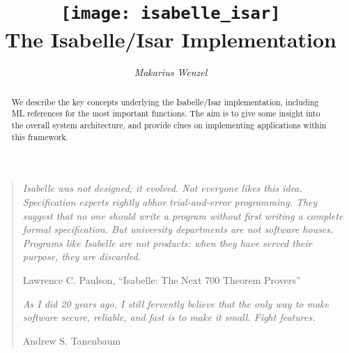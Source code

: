 \documentclass[12pt,a4paper,fleqn]{report}
\title{\texttt{[image: isabelle\_isar]}
  \\[4ex] The Isabelle/Isar Implementation}
\author{\emph{Makarius Wenzel}}
\begin{document}
\maketitle 

\begin{abstract}
  We describe the key concepts underlying the Isabelle/Isar
  implementation, including ML references for the most important
  functions.  The aim is to give some insight into the overall system
  architecture, and provide clues on implementing applications within
  this framework.
\end{abstract}

\vspace*{2.5cm}
\begin{quote}
  
  {\small\em Isabelle was not designed; it evolved.  Not everyone
    likes this idea.  Specification experts rightly abhor
    trial-and-error programming.  They suggest that no one should
    write a program without first writing a complete formal
    specification. But university departments are not software houses.
    Programs like Isabelle are not products: when they have served
    their purpose, they are discarded.}
  
  Lawrence C. Paulson, ``Isabelle: The Next 700 Theorem Provers''

  \vspace*{1cm}
  
  {\small\em As I did 20 years ago, I still fervently believe that the
    only way to make software secure, reliable, and fast is to make it
    small.  Fight features.}
  
  Andrew S. Tanenbaum

\end{quote}

\thispagestyle{empty}\clearpage

 \tableofcontents \clearfirst










\appendix


\begingroup
\tocentry{\bibname}
 \small\raggedright\frenchspacing

\endgroup


\tocentry{\indexname}
\printindex
\end{document}
